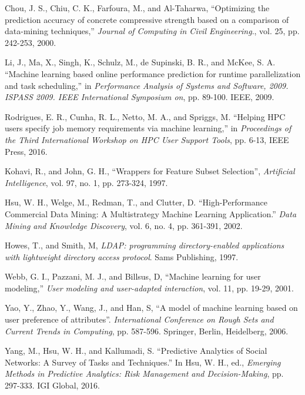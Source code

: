 \documentclass[conference]{csce}
\begin{document}
\begin{thebibliography}{1}
	Chou, J. S., Chiu, C. K., Farfoura, M., and Al-Taharwa, ``Optimizing the prediction accuracy of concrete compressive strength based on a comparison of data-mining techniques,''  \emph{Journal of Computing in Civil Engineering}., vol. 25, pp. 242-253, 2000.
	
	Li, J., Ma, X., Singh, K., Schulz, M., de Supinski, B. R., and McKee, S. A. ``Machine learning based online performance prediction for runtime parallelization and task scheduling,'' in \emph{Performance Analysis of Systems and Software, 2009. ISPASS 2009. IEEE International Symposium on}, pp. 89-100. IEEE, 2009.
	
	Rodrigues, E. R., Cunha, R. L., Netto, M. A., and Spriggs, M. ``Helping HPC users specify job memory requirements via machine learning,'' in \emph{Proceedings of the Third International Workshop on HPC User Support Tools}, pp. 6-13, IEEE Press, 2016.
	
	Kohavi, R., and John, G. H., ``Wrappers for Feature Subset Selection'', \emph{Artificial Intelligence}, vol. 97, no. 1, pp. 273-324, 1997.
 
	Hsu, W. H., Welge, M., Redman, T., and Clutter, D.  ``High-Performance Commercial Data Mining: A Multistrategy Machine Learning Application.'' \emph{Data Mining and Knowledge Discovery}, vol. 6, no. 4, pp. 361-391, 2002.
    
	Howes, T., and Smith, M, \emph{LDAP: programming directory-enabled applications with lightweight directory access protocol}. Sams Publishing, 1997.	

	Webb, G. I., Pazzani, M. J., and Billsus, D, ``Machine learning for user modeling,'' \emph{User modeling and user-adapted interaction}, vol. 11, pp. 19-29, 2001.
	
	Yao, Y., Zhao, Y., Wang, J., and Han, S, ``A model of machine learning based on user preference of attributes''. \emph{International Conference on Rough Sets and Current Trends in Computing}, pp. 587-596. Springer, Berlin, Heidelberg, 2006.

    Yang, M., Hsu, W. H., and Kallumadi, S. ``Predictive Analytics of Social Networks: A Survey of Tasks and Techniques.'' In Hsu, W. H., ed., \emph{Emerging Methods in Predictive Analytics: Risk Management and Decision-Making}, pp. 297-333. IGI Global, 2016.
    

\end{thebibliography}
\end{document}
